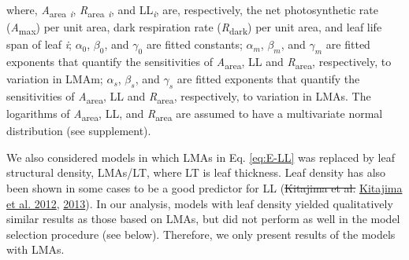 \documentclass[
  12pt,
]{article}
\providecommand{\DIFdeltex}[1]{{\protect\color{red}\sout{#1}}}                      %
\providecommand{\DIFaddbegin}{} %
\providecommand{\DIFaddend}{} %
\providecommand{\DIFdelbegin}{} %
\providecommand{\DIFdelend}{} %
\providecommand{\DIFdel}[1]{\texorpdfstring{\DIFdeltex{#1}}{}} %
\newcommand{\DIFscaledelfig}{0.5}
\newlength{\DIFdelgraphicswidth} %
\newlength{\DIFdelgraphicsheight} %
\newcommand{\DIFaddincludegraphics}[2][]{{\color{blue}\fbox{\DIFOincludegraphics[#1]{#2}}}} %
\newcommand{\DIFdelincludegraphics}[2][]{%
\sbox{\DIFdelgraphicsbox}{\DIFOincludegraphics[#1]{#2}}%
\settoboxwidth{\DIFdelgraphicswidth}{\DIFdelgraphicsbox} %
\settoboxtotalheight{\DIFdelgraphicsheight}{\DIFdelgraphicsbox} %
\scalebox{\DIFscaledelfig}{%
\parbox[b]{\DIFdelgraphicswidth}{\usebox{\DIFdelgraphicsbox}\\[-\baselineskip] \rule{\DIFdelgraphicswidth}{0em}}\llap{\resizebox{\DIFdelgraphicswidth}{\DIFdelgraphicsheight}{%
\setlength{\unitlength}{\DIFdelgraphicswidth}%
\begin{picture}(1,1)%
\thicklines\linethickness{2pt} %
{\color[rgb]{1,0,0}\put(0,0){\framebox(1,1){}}}%
{\color[rgb]{1,0,0}\put(0,0){\line( 1,1){1}}}%
{\color[rgb]{1,0,0}\put(0,1){\line(1,-1){1}}}%
\end{picture}%
}\hspace*{3pt}}} %
} %
\DeclareRobustCommand{\DIFaddbegin}{\DIFOaddbegin \let\includegraphics\DIFaddincludegraphics} %
\DeclareRobustCommand{\DIFaddend}{\DIFOaddend \let\includegraphics\DIFOincludegraphics} %
\DeclareRobustCommand{\DIFdelbegin}{\DIFOdelbegin \let\includegraphics\DIFdelincludegraphics} %
\DeclareRobustCommand{\DIFdelend}{\DIFOaddend \let\includegraphics\DIFOincludegraphics} %
\begin{document}
where, \emph{A}\textsubscript{area} \textsubscript{\emph{i}}, \emph{R}\textsubscript{area} \textsubscript{\emph{i}}, and LL\textsubscript{\emph{i}}, are, respectively, the net photosynthetic rate (\emph{A}\textsubscript{max}) per unit area, dark respiration rate (\emph{R}\textsubscript{dark}) per unit area, and leaf life span of leaf \emph{i}; \(\alpha_0\), \(\beta_0\), and \(\gamma_0\) are fitted constants; \(\alpha_m\), \(\beta_m\), and \(\gamma_m\) are fitted exponents that quantify the sensitivities of \emph{A}\textsubscript{area}, LL and \emph{R}\textsubscript{area}, respectively, to variation in LMAm; \(\alpha_s\), \(\beta_s\), and \(\gamma_s\) are fitted exponents that quantify the sensitivities of \emph{A}\textsubscript{area}, LL and \emph{R}\textsubscript{area}, respectively, to variation in LMAs.
The logarithms of \emph{A}\textsubscript{area}, LL, and \emph{R}\textsubscript{area} are assumed to have a multivariate normal distribution (see supplement).

We also considered models in which LMAs in Eq. \eqref{eq:E-LL} was replaced by leaf structural density, LMAs/LT, where LT is leaf thickness.
Leaf density has also been shown in some cases to be a good predictor for LL (\DIFdelbegin \DIFdel{Kitajima et al. }\DIFdelend \protect\DIFdelbegin %
\DIFdelend \DIFaddbegin \hyperlink{ref-Kitajima2012}{Kitajima et al. 2012}\DIFaddend , \protect\hyperlink{ref-Kitajima2013}{2013}).
In our analysis, models with leaf density yielded qualitatively similar results as those based on LMAs, but did not perform as well in the model selection procedure (see below).
Therefore, we only present results of the models with LMAs.
\end{document}
